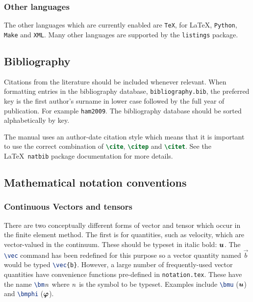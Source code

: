 \subsubsection{Other languages}

The other languages which are currently enabled are
\lstinline[language=TeX]+TeX+, for \LaTeX, \lstinline[language=TeX]+Python+,
\lstinline[language=TeX]+Make+ and \lstinline[language=TeX]+XML+. Many other
languages are supported by the \lstinline[language=TeX]+listings+ package.

\subsection{Bibliography}

Citations from the literature should be included whenever relevant. When
formatting entries in the bibliography database,
\lstinline[language=Bash]+bibliography.bib+, the preferred key is the first
author's surname in lower case followed by the full year of publication. For
example \lstinline[language=TeX]+ham2009+. The bibliography database should
be sorted alphabetically by key.

The manual uses an author-date citation style which means that it is
important to use the correct combination of
\lstinline[language=TeX]+\cite+,  \lstinline[language=TeX]+\citep+ and
\lstinline[language=TeX]+\citet+. See the \LaTeX\ \lstinline[language=TeX]+natbib+
 package documentation for more details.

\subsection{Mathematical notation conventions}

\subsubsection{Continuous Vectors and tensors}

There are two conceptually different forms of vector and tensor which occur
in the finite element method. The first is for quantities, such as velocity,
which are vector-valued in the continuum. These should be typeset in italic
bold: ${\mbox{\boldmath$u$}}$. The \lstinline[language=TeX]+\vec+ command has been redefined
for this purpose so a vector quantity named $\vec{b}$ would be typed
\lstinline[language=TeX]+\vec{b}+. However, a large number of
frequently-used vector quantities have convenience functions pre-defined in
\lstinline[language=bash]+notation.tex+. These have the name
\lstinline[language=TeX]+\bm+\textit{n}\ where \textit{n}\ is the symbol to
be typeset. Examples include \lstinline[language=TeX]+\bmu+ (${\mbox{\boldmath$u$}}$) and
\lstinline[language=TeX]+\bmphi+ (${\mbox{\boldmath$\varphi$}}$).

